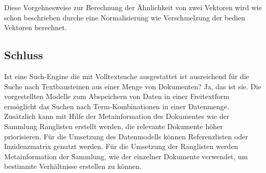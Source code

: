 Diese Vorgehnesweise zur Berechnung der Ähnlichkeit von zwei Vektoren
wird wie schon beschrieben durche eine Normalisierung wie Verschmelzung
der bedien Vektoren berechnet.
\newline
\begin{figure}[h]
\centering
{}
\end{figure}

\subsection[Schluss]{Schluss}
Ist eine Such-Engine die mit Volltextsuche ausgestattet ist ausreichend
für die Suche nach Textbausteinen aus einer Menge von Dokumenten? Ja,
das ist sie. Die vorgestellten Modelle zum Abspeichern von Daten in
einer Freitextform ermöglicht das Suchen nach Term-Kombinationen in
einer Datenmenge. Zusätzlich kann mit Hilfe der Metainformation des
Dokumentes wie der Sammlung Ranglisten erstellt werden, die relevante
Dokumente höher priorisieren. 
\newline
Für die Umsetzung des Datenmodells können Referenzlisten oder
Inzidenzmatrix genutzt werden.  
\newline
Für die Umsetzung der Ranglisten werden Metainformation der Sammlung,
wie der einzelner Dokumente verwendet, um bestimmte Verhältnisse
erstellen zu können.

